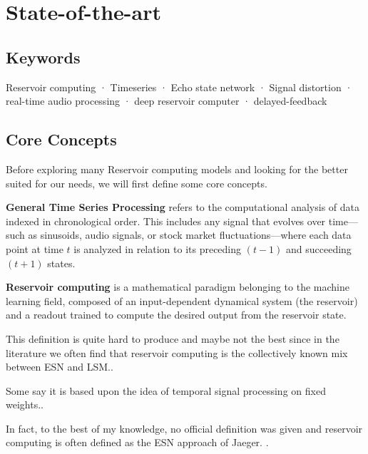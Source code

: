 \newpage
\section{State-of-the-art}

\subsection{Keywords}
Reservoir computing ·  Timeseries · Echo state network · Signal distortion · real-time audio processing · deep reservoir computer · delayed-feedback

\subsection{Core Concepts}

Before exploring many Reservoir computing models and looking for the better suited for our needs, we will first define some core concepts. 

\vspace{0.5cm}

\textbf{General Time Series Processing} refers to the computational analysis of data indexed in chronological order. This includes any signal that evolves over time—such as sinusoids, audio signals, or stock market fluctuations—where each data point at time $t$ is analyzed in relation to its preceding $(t-1)$ and succeeding $(t+1)$ states.

\vspace{0.5cm}

\textbf{Reservoir computing} is a mathematical paradigm belonging to the machine learning field, composed of an input-dependent dynamical system (the reservoir) and a readout trained to compute the desired output from the reservoir state.

\vspace{0.3cm}

This definition is quite hard to produce and maybe not the best since in the literature we often find that reservoir computing is the collectively known mix between ESN and LSM.\cite{holzmann2010echo}.

\vspace{0.3cm}

Some say it is based upon the idea of temporal signal processing on fixed weights.\cite{wyffels2008band}.

\vspace{0.3cm}

In fact, to the best of my knowledge, no official definition was given and reservoir computing is often defined as the ESN\cite{Jaeger10ESN} approach of Jaeger. \cite{Gallicchio2017}. 

